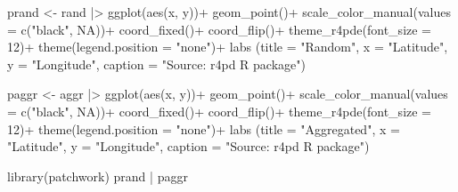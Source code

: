 \documentclass[
  letterpaper,
]{book}
\newenvironment{Shaded}{\begin{snugshade}}{\end{snugshade}}
\newcommand{\AttributeTok}[1]{\textcolor[rgb]{0.40,0.45,0.13}{#1}}
\newcommand{\ConstantTok}[1]{\textcolor[rgb]{0.56,0.35,0.01}{#1}}
\newcommand{\DecValTok}[1]{\textcolor[rgb]{0.68,0.00,0.00}{#1}}
\newcommand{\FunctionTok}[1]{\textcolor[rgb]{0.28,0.35,0.67}{#1}}
\newcommand{\NormalTok}[1]{\textcolor[rgb]{0.00,0.23,0.31}{#1}}
\newcommand{\OtherTok}[1]{\textcolor[rgb]{0.00,0.23,0.31}{#1}}
\newcommand{\SpecialCharTok}[1]{\textcolor[rgb]{0.37,0.37,0.37}{#1}}
\newcommand{\StringTok}[1]{\textcolor[rgb]{0.13,0.47,0.30}{#1}}
\begin{document}
\begin{Shaded}
\begin{Highlighting}[]
\NormalTok{prand }\OtherTok{\textless{}{-}}\NormalTok{ rand }\SpecialCharTok{|\textgreater{}} 
  \FunctionTok{ggplot}\NormalTok{(}\FunctionTok{aes}\NormalTok{(x, y))}\SpecialCharTok{+}
  \FunctionTok{geom\_point}\NormalTok{()}\SpecialCharTok{+}
  \FunctionTok{scale\_color\_manual}\NormalTok{(}\AttributeTok{values =} \FunctionTok{c}\NormalTok{(}\StringTok{"black"}\NormalTok{, }\ConstantTok{NA}\NormalTok{))}\SpecialCharTok{+}
  \FunctionTok{coord\_fixed}\NormalTok{()}\SpecialCharTok{+}
  \FunctionTok{coord\_flip}\NormalTok{()}\SpecialCharTok{+}
   \FunctionTok{theme\_r4pde}\NormalTok{(}\AttributeTok{font\_size =} \DecValTok{12}\NormalTok{)}\SpecialCharTok{+}
  \FunctionTok{theme}\NormalTok{(}\AttributeTok{legend.position =} \StringTok{"none"}\NormalTok{)}\SpecialCharTok{+}
  \FunctionTok{labs}\NormalTok{ (}\AttributeTok{title =} \StringTok{"Random"}\NormalTok{, }
        \AttributeTok{x =} \StringTok{"Latitude"}\NormalTok{,}
        \AttributeTok{y =} \StringTok{"Longitude"}\NormalTok{,}
        \AttributeTok{caption =} \StringTok{"Source: r4pd R package"}\NormalTok{)}

\NormalTok{paggr }\OtherTok{\textless{}{-}}\NormalTok{ aggr }\SpecialCharTok{|\textgreater{}} 
  \FunctionTok{ggplot}\NormalTok{(}\FunctionTok{aes}\NormalTok{(x, y))}\SpecialCharTok{+}
  \FunctionTok{geom\_point}\NormalTok{()}\SpecialCharTok{+}
  \FunctionTok{scale\_color\_manual}\NormalTok{(}\AttributeTok{values =} \FunctionTok{c}\NormalTok{(}\StringTok{"black"}\NormalTok{, }\ConstantTok{NA}\NormalTok{))}\SpecialCharTok{+}
  \FunctionTok{coord\_fixed}\NormalTok{()}\SpecialCharTok{+}
  \FunctionTok{coord\_flip}\NormalTok{()}\SpecialCharTok{+}
  \FunctionTok{theme\_r4pde}\NormalTok{(}\AttributeTok{font\_size =} \DecValTok{12}\NormalTok{)}\SpecialCharTok{+}
  \FunctionTok{theme}\NormalTok{(}\AttributeTok{legend.position =} \StringTok{"none"}\NormalTok{)}\SpecialCharTok{+}
  \FunctionTok{labs}\NormalTok{ (}\AttributeTok{title =} \StringTok{"Aggregated"}\NormalTok{, }
        \AttributeTok{x =} \StringTok{"Latitude"}\NormalTok{,}
        \AttributeTok{y =} \StringTok{"Longitude"}\NormalTok{,}
        \AttributeTok{caption =} \StringTok{"Source: r4pd R package"}\NormalTok{)}

\FunctionTok{library}\NormalTok{(patchwork)}
\NormalTok{prand }\SpecialCharTok{|}\NormalTok{ paggr}
\end{Highlighting}
\end{Shaded}
\end{document}
